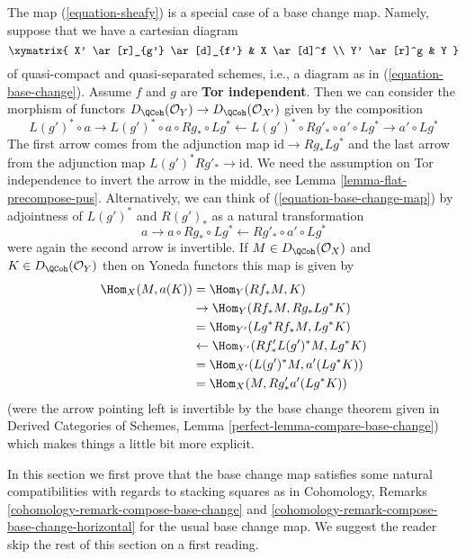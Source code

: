 \noindent
The map (\ref{equation-sheafy}) is a special case of a base change map.
Namely, suppose that we have a cartesian diagram
$$
\xymatrix{
X' \ar[r]_{g'} \ar[d]_{f'} & X \ar[d]^f \\
Y' \ar[r]^g & Y
}
$$
of quasi-compact and quasi-separated schemes, i.e., a diagram as in
(\ref{equation-base-change}). Assume $f$ and $g$ are {\bf Tor independent}.
Then we can consider the morphism of functors
$D_\QCoh(\mathcal{O}_Y) \to D_\QCoh(\mathcal{O}_{X'})$
given by the composition
\begin{equation}
\label{equation-base-change-map}
L(g')^* \circ a \to
L(g')^* \circ a \circ Rg_* \circ Lg^* \leftarrow
L(g')^* \circ Rg'_* \circ a' \circ Lg^* \to a' \circ Lg^*
\end{equation}
The first arrow comes from the adjunction map $\text{id} \to Rg_* Lg^*$
and the last arrow from the adjunction map $L(g')^*Rg'_* \to \text{id}$.
We need the assumption on Tor independence to invert the arrow
in the middle, see Lemma \ref{lemma-flat-precompose-pus}.
Alternatively, we can think of (\ref{equation-base-change-map}) by
adjointness of $L(g')^*$ and $R(g')_*$ as a natural transformation
$$
a \to a \circ Rg_* \circ Lg^* \leftarrow Rg'_* \circ a' \circ Lg^*
$$
were again the second arrow is invertible. If $M \in D_\QCoh(\mathcal{O}_X)$
and $K \in D_\QCoh(\mathcal{O}_Y)$
then on Yoneda functors this map is given by
\begin{align*}
\Hom_X(M, a(K))
& =
\Hom_Y(Rf_*M, K) \\
& \to
\Hom_Y(Rf_*M, Rg_* Lg^*K) \\
& =
\Hom_{Y'}(Lg^*Rf_*M, Lg^*K) \\
& \leftarrow
\Hom_{Y'}(Rf'_* L(g')^*M, Lg^*K) \\
& =
\Hom_{X'}(L(g')^*M, a'(Lg^*K)) \\
& =
\Hom_X(M, Rg'_*a'(Lg^*K))
\end{align*}
(were the arrow pointing left is invertible by the base
change theorem given in
Derived Categories of Schemes, Lemma \ref{perfect-lemma-compare-base-change})
which makes things a little bit more explicit.

\medskip\noindent
In this section we first prove that the base change map satisfies
some natural compatibilities with regards to stacking squares as in
Cohomology, Remarks \ref{cohomology-remark-compose-base-change} and
\ref{cohomology-remark-compose-base-change-horizontal} for the usual
base change map. We suggest the reader skip the rest of this section
on a first reading.

